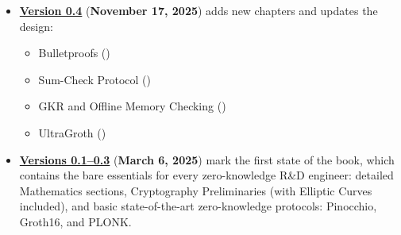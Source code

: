 \begin{itemize}
    \item \href{https://github.com/BlockstreamResearch/zk-book/releases/tag/v0.4}{\textbf{Version 0.4}} (\textbf{November 17, 2025}) adds new chapters and updates the design:
    \begin{itemize}
        \item Bulletproofs ()
        \item Sum-Check Protocol ()
        \item GKR and Offline Memory Checking ()
        \item UltraGroth ()
    \end{itemize}
    \item \href{https://github.com/BlockstreamResearch/zk-book/releases/tag/v0.3}{\textbf{Versions 0.1--0.3}} (\textbf{March 6, 2025}) mark the first state of the book, which contains the bare essentials for every zero-knowledge R\&D engineer: detailed Mathematics sections, Cryptography Preliminaries (with Elliptic Curves included), and basic state-of-the-art zero-knowledge protocols: Pinocchio, Groth16, and PLONK.
\end{itemize}